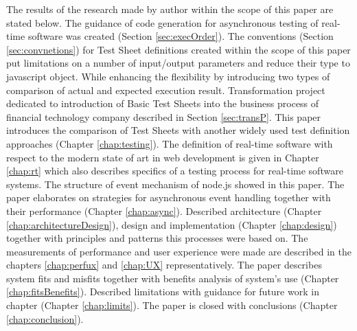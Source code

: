The results of the research made by author within the scope of this paper are stated below.
The guidance of code generation for asynchronous testing of real-time software was created (Section \ref{sec:execOrder}). 
The conventions (Section \ref{sec:convnetions}) for Test Sheet definitions created within the scope of this paper put limitations on a number of input/output parameters and reduce their type to javascript object.
While enhancing the flexibility by introducing two types of comparison of actual and expected execution result. 
Transformation project dedicated to introduction of Basic Test Sheets into the business process of financial technology company described in Section \ref{sec:transP}.
This paper introduces the comparison of Test Sheets with another widely used test definition approaches (Chapter \ref{chap:testing}). 
The definition of real-time software with respect to the modern state of art in web development is given in Chapter \ref{chap:rt} which also describes specifics of a testing process for real-time software systems.
The structure of event mechanism of node.js showed in this paper. The paper elaborates on strategies for asynchronous event handling together with their performance (Chapter \ref{chap:async}). 
Described architecture (Chapter \ref{chap:architectureDesign}), design and implementation (Chapter \ref{chap:design}) together with principles and patterns this processes were based on. 
The measurements of performance and user experience were made are described in the chapters \ref{chap:perfux} and \ref{chap:UX} representatively. 
The paper describes system fits and misfits together with benefits analysis of system's use (Chapter \ref{chap:fitsBenefits}).
Described limitations with guidance for future work in chapter (Chapter \ref{chap:limits}). The paper is closed with conclusions (Chapter \ref{chap:conclusion}).



